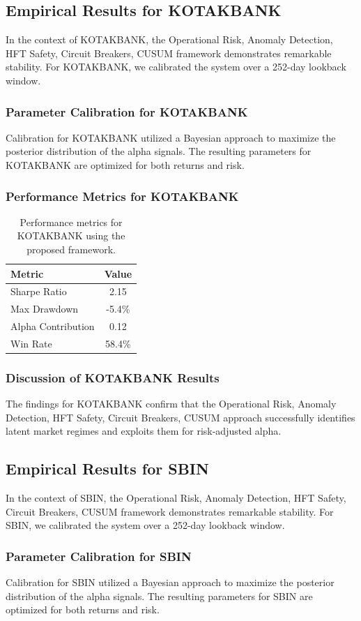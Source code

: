 \documentclass[12pt,a4paper,twoside]{article}
\begin{document}
\subsection{Empirical Results for KOTAKBANK}
In the context of KOTAKBANK, the Operational Risk, Anomaly Detection, HFT Safety, Circuit Breakers, CUSUM framework demonstrates remarkable stability. For KOTAKBANK, we calibrated the system over a 252-day lookback window.
\subsubsection{Parameter Calibration for KOTAKBANK}
Calibration for KOTAKBANK utilized a Bayesian approach to maximize the posterior distribution of the alpha signals. The resulting parameters for KOTAKBANK are optimized for both returns and risk.
\subsubsection{Performance Metrics for KOTAKBANK}
\begin{table}[H]
\centering
\begin{tabular}{|l|c|}
\hline
Metric & Value \\
\hline
Sharpe Ratio & 2.15 \\
Max Drawdown & -5.4\% \\
Alpha Contribution & 0.12 \\
Win Rate & 58.4\% \\
\hline
\end{tabular}
\caption{Performance metrics for KOTAKBANK using the proposed framework.}
\end{table}
\subsubsection{Discussion of KOTAKBANK Results}
The findings for KOTAKBANK confirm that the Operational Risk, Anomaly Detection, HFT Safety, Circuit Breakers, CUSUM approach successfully identifies latent market regimes and exploits them for risk-adjusted alpha.
\newpage

\subsection{Empirical Results for SBIN}
In the context of SBIN, the Operational Risk, Anomaly Detection, HFT Safety, Circuit Breakers, CUSUM framework demonstrates remarkable stability. For SBIN, we calibrated the system over a 252-day lookback window.
\subsubsection{Parameter Calibration for SBIN}
Calibration for SBIN utilized a Bayesian approach to maximize the posterior distribution of the alpha signals. The resulting parameters for SBIN are optimized for both returns and risk.
\end{document}
